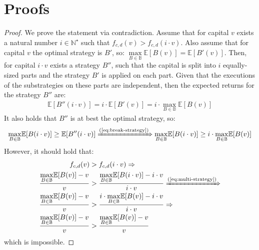 \appendix

\section{Proofs}

\restateLemSybilStrategies*
\begin{proof}
    We prove the statement via contradiction. Assume that for capital $v$
    exists a natural number $i \in \mathbb{N}^\star$ such that
    $f_{c,d}(v) > f_{c,d}(i \cdot v)$. Also assume that for
    capital $v$ the optimal strategy is $B'$, so: $\underset{B \in
    \mathbb{B}}{\max}{\mathbb{E}[B(v)]} = \mathbb{E}[B'(v)]$. Then, for capital
    $i \cdot v$ exists a strategy $B''$, such that the capital is split into $i$
    equally-sized parts and the strategy $B'$ is applied on each part. Given
    that the executions of the substrategies on these parts are independent,
    then the expected returns for the strategy $B''$ are:
    \begin{align}\label{eq:break-strategy}
        \mathbb{E}[B''(i \cdot v)] = i \cdot \mathbb{E}[B'(v)]  = i \cdot \underset{B \in \mathbb{B}}{\max}{\mathbb{E}[B(v)]}
    \end{align}
    It also holds that $B''$ is at best the optimal strategy, so:
    \begin{align}\label{eq:multi-strategy}
        \underset{B \in \mathbb{B}}{\max}{\mathbb{E}[B(i \cdot v)]} \geq \mathbb{E}[B''(i \cdot v)] \xRightarrow{\text{(\ref{eq:break-strategy})}}
        \underset{B \in \mathbb{B}}{\max}{\mathbb{E}[B(i \cdot v)]} \geq i \cdot \underset{B \in \mathbb{B}}{\max}{\mathbb{E}[B(v)]}
    \end{align}
    However, it should hold that:
    \begin{alignat}{2}
        f_{c,d}(v) &> f_{c,d}(i \cdot v) \Rightarrow \notag\\
        \frac{\underset{B \in \mathbb{B}}{\max}{\mathbb{E}[B(v)]} - v}{v} &> \frac{\underset{B \in \mathbb{B}}{\max}{\mathbb{E}[B(i \cdot v)]} - i \cdot v}{i \cdot v} \xRightarrow{\text{(\ref{eq:multi-strategy})}} \notag\\
        \frac{\underset{B \in \mathbb{B}}{\max}{\mathbb{E}[B(v)]} - v}{v} &> \frac{i \cdot \underset{B \in \mathbb{B}}{\max}{\mathbb{E}[B(v)]} - i \cdot v}{i \cdot v} \Rightarrow \notag\\
        \frac{\underset{B \in \mathbb{B}}{\max}{\mathbb{E}[B(v)]} - v}{v} &> \frac{\underset{B \in \mathbb{B}}{\max}{\mathbb{E}[B(v)]} - v}{v}
    \end{alignat}
    which is impossible.
\end{proof}


